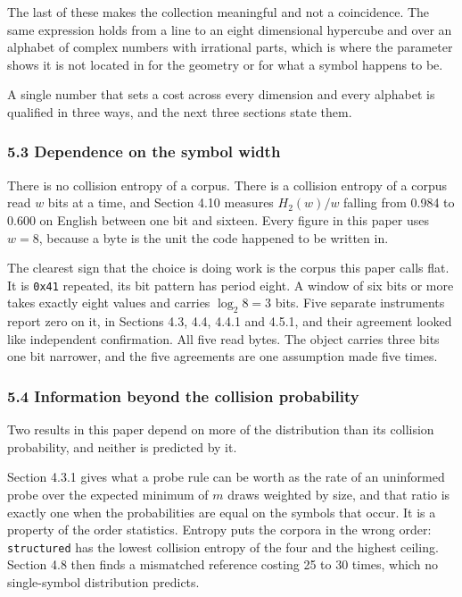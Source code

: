 The last of these makes the collection meaningful and not a coincidence. The same expression holds from a line to an eight dimensional hypercube and over an alphabet of complex numbers with irrational parts, which is where the parameter shows it is not located in for the geometry or for what a symbol happens to be.

A single number that sets a cost across every dimension and every alphabet is qualified in three ways, and the next three sections state them.

\subsubsection{5.3 Dependence on the symbol width}

There is no collision entropy of a corpus. There is a collision entropy of a corpus read \(w\) bits at a time, and Section 4.10 measures \(H_2(w)/w\) falling from 0.984 to 0.600 on English between one bit and sixteen. Every figure in this paper uses \(w = 8\), because a byte is the unit the code happened to be written in.

The clearest sign that the choice is doing work is the corpus this paper calls flat. It is \texttt{0x41} repeated, its bit pattern has period eight. A window of six bits or more takes exactly eight values and carries \(\log_2 8 = 3\) bits. Five separate instruments report zero on it, in Sections 4.3, 4.4, 4.4.1 and 4.5.1, and their agreement looked like independent confirmation. All five read bytes. The object carries three bits one bit narrower, and the five agreements are one assumption made five times.

\subsubsection{5.4 Information beyond the collision probability}

Two results in this paper depend on more of the distribution than its collision probability, and neither is predicted by it.

Section 4.3.1 gives what a probe rule can be worth as the rate of an uninformed probe over the expected minimum of \(m\) draws weighted by size, and that ratio is exactly one when the probabilities are equal on the symbols that occur. It is a property of the order statistics. Entropy puts the corpora in the wrong order: \texttt{structured} has the lowest collision entropy of the four and the highest ceiling. Section 4.8 then finds a mismatched reference costing 25 to 30 times, which no single-symbol distribution predicts.

